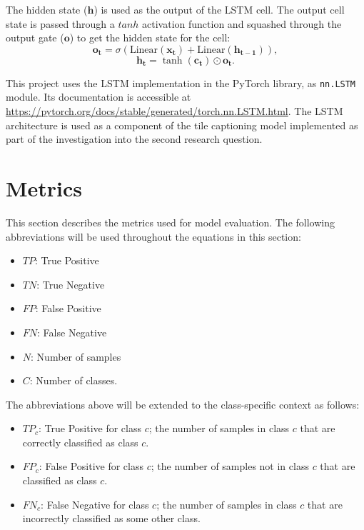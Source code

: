 \documentclass{l4proj}
\begin{document}
The hidden state ($\mathbf{h}$) is used as the output of the LSTM cell. The output cell state is passed through a $tanh$ activation function and squashed through the output gate ($\mathbf{o}$) to get the hidden state for the cell:
\begin{equation}
    \mathbf{o_t} = \sigma(\text{Linear}(\mathbf{x_t}) + \text{Linear}(\mathbf{h_{t-1}})),
\end{equation}
\begin{equation}
    \mathbf{h_t} = \tanh(\mathbf{c_t}) \odot \mathbf{o_t}.
\end{equation}

This project uses the LSTM implementation in the PyTorch library, as \verb|nn.LSTM| module. Its documentation is accessible at \url{https://pytorch.org/docs/stable/generated/torch.nn.LSTM.html}. The LSTM architecture is used as a component of the tile captioning model implemented as part of the investigation into the second research question. 


\section{Metrics} \label{sec:metrics}
This section describes the metrics used for model evaluation. The following abbreviations will be used throughout the equations in this section:
\begin{itemize}
    \item $TP$: True Positive
    \item $TN$: True Negative
    \item $FP$: False Positive
    \item $FN$: False Negative
    \item $N$: Number of samples
    \item $C$: Number of classes.
\end{itemize}

The abbreviations above will be extended to the class-specific context as follows:
\begin{itemize}
    \item $TP_c$: True Positive for class $c$; the number of samples in class $c$ that are correctly classified as class $c$.
    \item $FP_c$: False Positive for class $c$; the number of samples not in class $c$ that are classified as class $c$.
    \item $FN_c$: False Negative for class $c$; the number of samples in class $c$ that are incorrectly classified as some other class.
\end{itemize}
\end{document}
